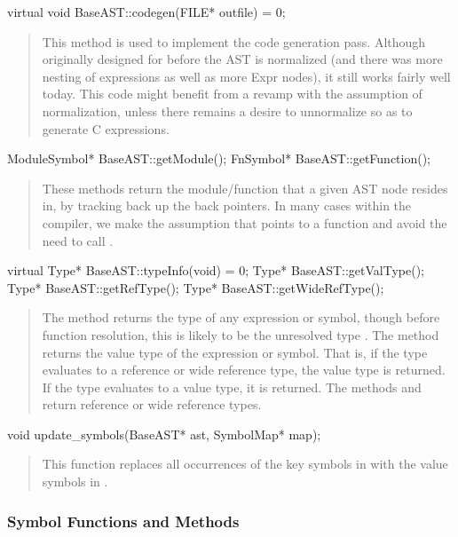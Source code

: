 \documentclass[10pt]{article}
\begin{document}
\begin{clang}
virtual void BaseAST::codegen(FILE* outfile) = 0;
\end{clang}
\begin{quote}
This method is used to implement the code generation pass.  Although
originally designed for before the AST is normalized (and there was
more nesting of expressions as well as more Expr nodes), it still
works fairly well today.  This code might benefit from a revamp with
the assumption of normalization, unless there remains a desire to
unnormalize so as to generate C expressions.
\end{quote}

\begin{clang}
ModuleSymbol* BaseAST::getModule();
FnSymbol* BaseAST::getFunction();
\end{clang}
\begin{quote}
These methods return the module/function that a given AST node resides
in, by tracking back up the back pointers.  In many cases within the
compiler, we make the assumption that  points to a
function and avoid the need to call .
\end{quote}

\begin{clang}
virtual Type* BaseAST::typeInfo(void) = 0;
Type* BaseAST::getValType();
Type* BaseAST::getRefType();
Type* BaseAST::getWideRefType();
\end{clang}
\begin{quote}
The method  returns the type of any expression or symbol,
  though before function resolution, this is likely to be the
  unresolved type .  The method  returns
  the value type of the expression or symbol.  That is, if the type
  evaluates to a reference or wide reference type, the value type is
  returned.  If the type evaluates to a value type, it is returned.
  The methods  and  return reference
  or wide reference types.
\end{quote}

\begin{clang}
void update_symbols(BaseAST* ast, SymbolMap* map);
\end{clang}
\begin{quote}
This function replaces all occurrences of the key symbols in 
with the value symbols in .
\end{quote}

\subsubsection{Symbol Functions and Methods}
\end{document}
